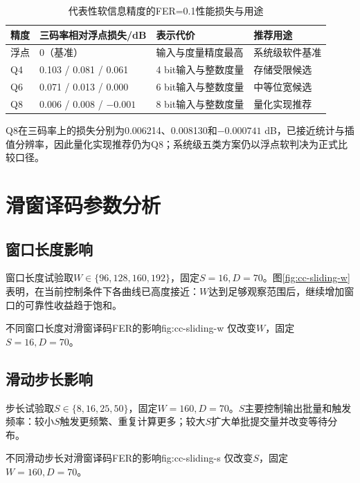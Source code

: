 \begin{table}[htbp]
  \centering
  \small
  \caption{代表性软信息精度的FER=0.1性能损失与用途}
  \label{tab:cc-quantization-results}
  \begin{tabular}{p{}p{}p{}p{}}
    \toprule
    精度 & 三码率相对浮点损失/dB & 表示代价 & 推荐用途 \\
    \midrule
    浮点 & 0（基准） & 输入与度量精度最高 & 系统级软件基准 \\
    Q4 & 0.103 / 0.081 / 0.061 & 4 bit输入与整数度量 & 存储受限候选 \\
    Q6 & 0.071 / 0.013 / 0.000 & 6 bit输入与整数度量 & 中等位宽候选 \\
    Q8 & 0.006 / 0.008 / $-0.001$ & 8 bit输入与整数度量 & 量化实现推荐 \\
    \bottomrule
  \end{tabular}
\end{table}

Q8在三码率上的损失分别为0.006214、0.008130和$-0.000741$ dB，已接近统计与插值分辨率，因此量化实现推荐仍为Q8；系统级五类方案仍以浮点软判决为正式比较口径。

\section{滑窗译码参数分析}

\subsection{窗口长度影响}

窗口长度试验取$W\in\{96,128,160,192\}$，固定$S=16,D=70$。图\ref{fig:cc-sliding-w}表明，在当前控制条件下各曲线已高度接近：$W$达到足够观察范围后，继续增加窗口的可靠性收益趋于饱和。

  {不同窗口长度对滑窗译码FER的影响}{fig:cc-sliding-w}
  {仅改变$W$，固定$S=16,D=70$。}

\subsection{滑动步长影响}

步长试验取$S\in\{8,16,25,50\}$，固定$W=160,D=70$。$S$主要控制输出批量和触发频率：较小$S$触发更频繁、重复计算更多；较大$S$扩大单批提交量并改变等待分布。

  {不同滑动步长对滑窗译码FER的影响}{fig:cc-sliding-s}
  {仅改变$S$，固定$W=160,D=70$。}

